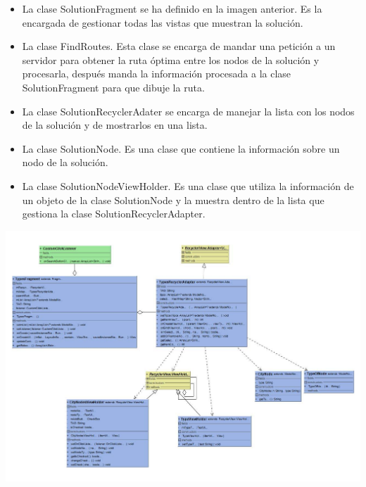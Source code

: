 \begin{itemize}
	\item La clase SolutionFragment se ha definido en la imagen anterior. Es la encargada de gestionar todas las vistas que muestran la solución.
	\item La clase FindRoutes. Esta clase se encarga de mandar una petición a un servidor para obtener la ruta óptima entre los nodos de la solución y procesarla, después manda la información procesada a la clase SolutionFragment para que dibuje la ruta.
	\item La clase SolutionRecyclerAdater se encarga de manejar la lista con los nodos de la solución y de mostrarlos en una lista.
	\item La clase SolutionNode. Es una clase que contiene la información sobre un nodo de la solución.
	\item La clase SolutionNodeViewHolder. Es una clase que utiliza la información de un objeto de la clase SolutionNode  y la muestra dentro de la lista que gestiona la clase SolutionRecyclerAdapter.
\end{itemize}
\thispagestyle{empty}
{%
	\label{fig:fragment_diagram}
	\centering
	\includegraphics[scale=.95,angle=90]{imagenes/fragment_class_diagram.pdf}
	\par
}
\restoregeometry


